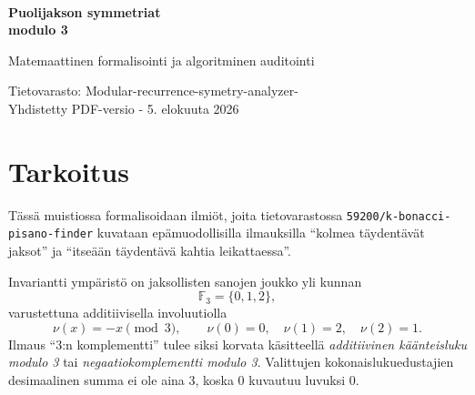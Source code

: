 \documentclass[11pt,a4paper]{article}
\newcommand{\F}{\mathbb{F}}
\begin{document}
\sloppy
\thispagestyle{empty}
\vspace*{20mm}
\noindent\noindent{\color{AccentBlue}\rule{\textwidth}{0.8pt}}\\[22mm]
{\raggedright\fontsize{24}{29}\selectfont\bfseries\color{TitleBlue}Puolijakson symmetriat\\ modulo 3\par}
\vspace{9mm}
{\fontsize{15}{20}\selectfont\color{AccentBlue}Matemaattinen formalisointi ja algoritminen auditointi\par}
\vspace{17mm}
\noindent{}
\vfill
{\color{TitleBlue}\small
Tietovarasto: \textsf{Modular-recurrence-symetry-analyzer-}\\
Yhdistetty PDF-versio - 5. elokuuta 2026
}\par
\vspace{18mm}
\noindent{\color{AccentBlue}\rule{\textwidth}{0.8pt}}
\clearpage
\setcounter{page}{1}

\tableofcontents
\clearpage


\section{Tarkoitus}
Tässä muistiossa formalisoidaan ilmiöt, joita tietovarastossa \nolinkurl{59200/k-bonacci-pisano-finder} kuvataan epämuodollisilla ilmauksilla ``kolmea täydentävät jaksot'' ja ``itseään täydentävä kahtia leikattaessa''.

Invariantti ympäristö on jaksollisten sanojen joukko yli kunnan
\[
\F_3=\{0,1,2\},
\]
varustettuna additiivisella involuutiolla
\[
\nu(x)=-x\pmod3,\qquad \nu(0)=0,\quad \nu(1)=2,\quad \nu(2)=1.
\]
Ilmaus ``3:n komplementti'' tulee siksi korvata käsitteellä \emph{additiivinen käänteisluku modulo 3} tai \emph{negaatiokomplementti modulo 3}. Valittujen kokonaislukuedustajien desimaalinen summa ei ole aina 3, koska 0 kuvautuu luvuksi 0.
\end{document}
